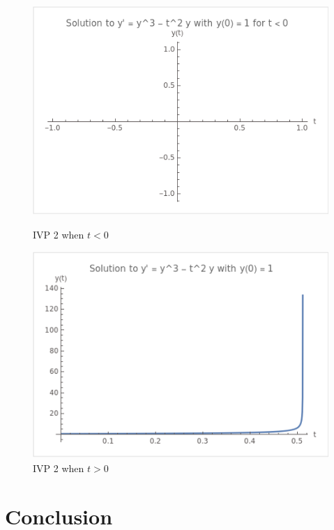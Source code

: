 \documentclass{article}
\begin{document}
\begin{figure}[htbp]
    \centering
    \begin{minipage}[b]{0.45\textwidth}
        \centering
        \includegraphics[width=\textwidth]{pic学长/图片3.png}
        \caption{IVP 2 when $t < 0$}
        \label{fig:image1}
    \end{minipage}
    \hspace{0.05\textwidth}
    \begin{minipage}[b]{0.45\textwidth}
        \centering
        \includegraphics[width=\textwidth]{pic学长/图片4.png}
        \caption{IVP 2 when $t > 0$}
        \label{fig:image2}
    \end{minipage}
\end{figure}


\section{Conclusion}
\end{document}
